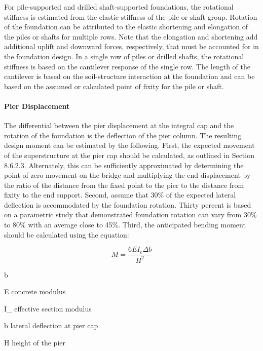 For pile-supported and drilled shaft-supported foundations, the rotational stiffness is estimated from the elastic stiffness of the pile or shaft group. Rotation of the foundation can be attributed to the elastic shortening and elongation of the piles or shafts for multiple rows. Note that the elongation and shortening add additional uplift and downward forces, respectively, that must be accounted for in the foundation design. In a single row of piles or drilled shafts, the rotational stiffness is based on the cantilever response of the single row. The length of the cantilever is based on the soil-structure interaction at the foundation and can be based on the assumed or calculated point of fixity for the pile or shaft.

\paragraph{Pier Displacement}
The differential between the pier displacement at the integral cap and the rotation of the foundation is the deflection of the pier column. The resulting design moment can be estimated by the following. First, the expected movement of the superstructure at the pier cap should be calculated, as outlined in Section 8.6.2.3. Alternately, this can be sufficiently approximated by determining the point of zero movement on the bridge and multiplying the end displacement by the ratio of the distance from the fixed point to the pier to the distance from fixity to the end support. Second, assume that 30\% of the expected lateral deflection is accommodated by the foundation rotation. Thirty percent is based on a parametric study that demonstrated foundation rotation can vary from 30\% to 80\% with an average close to 45\%. Third, the anticipated bending moment should be calculated using the equation:

\begin{equation}
  \label{eq:moment-cap}
  M = \frac{6EI_\text{c}\Delta b}{H^2}
\end{equation}
\begin{EqDesc}{\Delta b}
  \item[E] concrete modulus
  \item[I_\text{c}] effective section modulus
  \item[\Delta b] lateral deflection at pier cap
  \item[H] height of the pier
\end{EqDesc}

